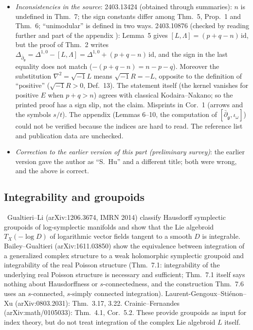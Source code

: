 \begin{itemize}
\item \emph{Inconsistencies in the source}: 2403.13424 (obtained through summaries): $n$ is undefined in Thm.~7; the sign constants differ among Thm.~5, Prop.~1 and Thm.~6; ``unimodular'' is defined in two ways. 2403.10876 (checked by reading further and part of the appendix \tC): Lemma~5 gives $[L,\Lambda]=(p+q-n)\,\mathrm{id}$, but the proof of Thm.~2 writes $\Delta_{\bar\partial_{\mathfrak g}}=\Delta^{1,0}-[L,\Lambda]=\Delta^{1,0}+(p+q-n)\,\mathrm{id}$, and the sign in the last equality does not match ($-(p+q-n)=n-p-q$). Moreover the substitution $\nabla^2=\sqrt{-1}L$ means $\sqrt{-1}R=-L$, opposite to the definition of ``positive'' ($\sqrt{-1}R>0$, Def.~13). The statement itself (the kernel vanishes for positive $E$ when $p+q>n$) agrees with classical Kodaira--Nakano; so the printed proof has a sign slip, not the claim. Misprints in Cor.~1 (arrows and the symbols $s/t$). The appendix (Lemmas 6--10, the computation of $[\bar\partial_{\mathfrak g},\iota_\omega]$) could not be verified because the indices are hard to read. The reference list and publication data are unchecked. \tQ
\item \emph{Correction to the earlier version of this part (preliminary survey)}: the earlier version gave the author as ``S.~Hu'' and a different title; both were wrong, and the above is correct.
\end{itemize}

\subsection{Integrability and groupoids}
\tC\ Gualtieri--Li (arXiv:1206.3674, IMRN 2014) classify Hausdorff symplectic groupoids of log-symplectic manifolds and show that the Lie algebroid $T_X(-\log D)$ of logarithmic vector fields tangent to a smooth $D$ is integrable. Bailey--Gualtieri (arXiv:1611.03850) show the equivalence between integration of a generalized complex structure to a weak holomorphic symplectic groupoid and integrability of the real Poisson structure (Thm.~7.1: integrability of the underlying real Poisson structure is necessary and sufficient; Thm.~7.1 itself says nothing about Hausdorffness or $s$-connectedness, and the construction Thm.~7.6 uses an $s$-connected, $s$-simply connected integration). Laurent-Gengoux--Sti\'enon--Xu (arXiv:0803.2031): Thm.~3.17, 3.22. Crainic--Fernandes (arXiv:math/0105033): Thm.~4.1, Cor.~5.2. These provide groupoids as input for index theory, but do not treat integration of the complex Lie algebroid $L$ itself.

